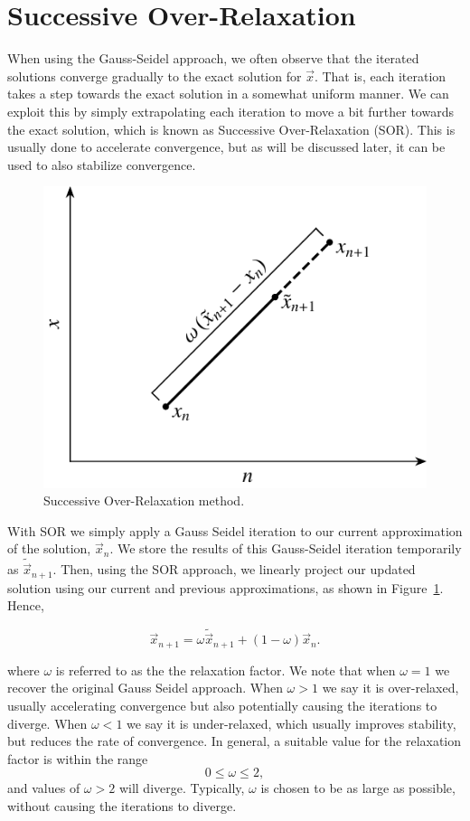 \section{Successive Over-Relaxation}
When using the Gauss-Seidel approach, we often observe that the iterated solutions converge gradually to the exact solution for $\vec{x}$. That is, each iteration takes a step towards the exact solution in a somewhat uniform manner. We can exploit this by simply extrapolating each iteration to move a bit further towards the exact solution, which is known as Successive Over-Relaxation (SOR). This is usually done to accelerate convergence, but as will be discussed later, it can be used to also stabilize convergence.
\begin{figure}[htbp]
	\centering
	\includegraphics[width=0.5\linewidth]{Pictures/itermethods_sor}
	\caption{Successive Over-Relaxation method.}
	\label{fig:sor}
\end{figure}

With SOR we simply apply a Gauss Seidel iteration to our current approximation of the solution, $\vec{x}_n$. We store the results of this Gauss-Seidel iteration temporarily as $\tilde{\vec{x}}_{n+1}$. Then, using the SOR approach, we linearly project our updated solution using our current and previous approximations, as shown in Figure~\ref{fig:sor}. Hence,
\begin{eqBox}
\begin{equation}
	\vec{x}_{n+1} = \omega \tilde{\vec{x}}_{n+1} + (1-\omega) \vec{x}_n.
\end{equation}
\end{eqBox}
where $\omega$ is referred to as the the relaxation factor. We note that when $\omega=1$ we recover the original Gauss Seidel approach. When $\omega>1$ we say it is over-relaxed, usually accelerating convergence but also potentially causing the iterations to diverge. When $\omega<1$ we say it is under-relaxed, which usually improves stability, but reduces the rate of convergence. In general, a suitable value for the relaxation factor is within the range
\begin{equation}
	0 \leq \omega \leq 2,
\end{equation}
and values of $\omega > 2$ will diverge. Typically, $\omega$ is chosen to be as large as possible, without causing the iterations to diverge.

